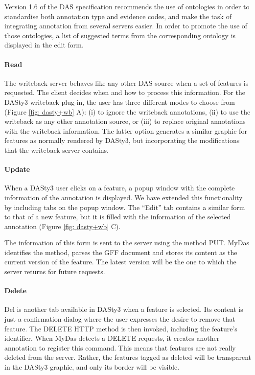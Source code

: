 Version 1.6 of the DAS specification recommends the use of ontologies in order to standardise both annotation type and evidence codes, and make the task of integrating annotation from several servers easier. In order to promote the use of those ontologies, a list of suggested terms from the corresponding ontology is displayed in the edit form.
  
\paragraph{Read}
The writeback server behaves like any other DAS source when a set of features is requested. The client decides when and how to process this information. For the DASty3 writeback plug-in, the user has three different modes to choose from (Figure \ref{fig: dasty+wb} A): (i) to ignore the writeback annotations, (ii) to use the writeback as any other annotation source, or (iii) to replace original annotations with the writeback information. The latter option generates a similar graphic for features as normally rendered by DASty3, but incorporating the modifications that the writeback server contains. 

\paragraph{Update}
When a DASty3 user clicks on a feature, a popup window with the complete information of the annotation is displayed. We have extended this functionality by including tabs on the popup window. The ``Edit'' tab contains a similar form to that of a new feature, but it is filled with the information of the selected annotation (Figure \ref{fig: dasty+wb} C). 

The information of this form is sent to the server using the method PUT. MyDas identifies the method, parses the GFF document and stores its content as the current version of the feature. The latest version will be the one to which the server returns for future requests.

\paragraph{Delete}
Del is another tab available in DASty3 when a feature is selected. Its content is just a confirmation dialog where the user expresses the desire to remove that feature. The DELETE HTTP method is then invoked, including the feature's identifier. When MyDas detects a DELETE requests, it creates another annotation to register this command.  This means that features are not really deleted from the server. Rather, the features tagged as deleted will be transparent in the DASty3 graphic, and only its border will be visible.


